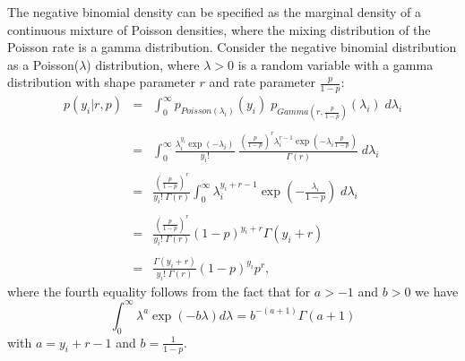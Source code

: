 \documentclass[11pt]{article}
\begin{document}
The negative binomial density can be specified as the marginal density of a continuous mixture of Poisson densities, where the mixing distribution of the Poisson rate is a gamma distribution. Consider the negative binomial distribution
as a Poisson($\lambda$) distribution, where $\lambda > 0$ is a random variable with a gamma distribution with shape parameter $r$ and rate parameter $\frac{p}{1-p}$:
\begin{eqnarray}\label{Poisson-gamma_appendix}
p(y_i|r,p) 
&=& \int_{0}^{\infty} p_{Poisson(\lambda_i)}(y_i)  \; p_{Gamma(r,\frac{p}{1-p})}(\lambda_i) \; d\lambda_i \nonumber \\
\nonumber \\
&=& \int_{0}^{\infty} \frac{\lambda_i^{y_i} \exp(-\lambda_i)}{y_i!}  \; 
\frac{\left(\frac{p}{1-p}\right)^{r} \lambda_i^{r-1} \exp \left(-\lambda_i  \frac{p}{1-p}\right)}{\Gamma(r)}
\; d\lambda_i \nonumber \\
\nonumber \\
&=& \frac{\left(\frac{p}{1-p}\right)^{r}}{y_i! \; \Gamma(r)}
\int_{0}^{\infty} \lambda_i^{y_i+r-1} \exp \left(- \frac{\lambda_i}{1-p} \right)  \; d\lambda_i \nonumber \\
\nonumber \\
&=& \frac{\left(\frac{p}{1-p}\right)^{r}}{y_i! \; \Gamma(r)} (1-p)^{y_i+r} \Gamma(y_i+r)\nonumber \\
\nonumber \\
&=& \frac{\Gamma(y_i+r)}{y_i! \; \Gamma(r)} (1-p)^{y_i} p^{r},
\end{eqnarray} 
where the fourth equality follows from the fact that for $a > -1$ and $b > 0$ we have
\begin{equation}\label{integral_Gamma_density}
\int_{0}^{\infty} \lambda^{a} \exp(-b \lambda) d\lambda = b^{-(a+1)} \Gamma(a+1)
\end{equation}
with $a = y_i + r-1$ and $b = \frac{1}{1-p}$.
\end{document}

